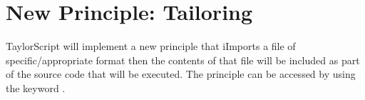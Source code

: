 \section{New Principle: Tailoring}

TaylorScript will implement a new principle that iImports a file of specific/appropriate format then the contents of that file will be included as part of the source code that will be executed. The principle can be accessed by using the keyword .